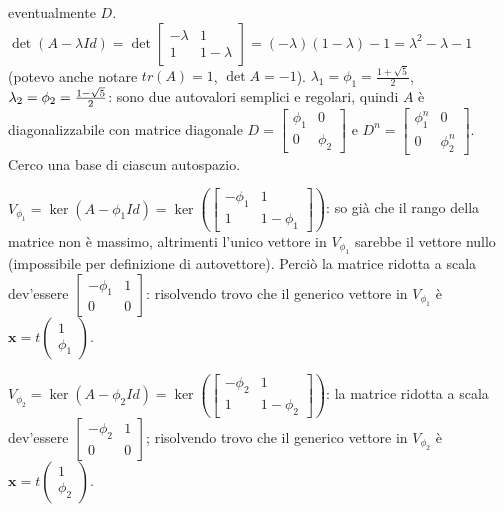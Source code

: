 \documentclass{article}
\begin{document}
\begin{enumerate}
eventualmente $D$. $\det \left( A-\lambda Id\right) =\det \left[ 
\begin{array}{cc}
-\lambda & 1 \\ 
1 & 1-\lambda%
\end{array}%
\right] =\left( -\lambda \right) \left( 1-\lambda \right) -1=\lambda
^{2}-\lambda -1$ (potevo anche notare $tr\left( A\right) =1$, $\det A=-1$). $%
\lambda _{1}=\phi _{1}=\frac{1+\sqrt{5}}{2}$, $\lambda _{2}=\phi _{2}=\frac{%
1-\sqrt{5}}{2}$: sono due autovalori semplici e regolari, quindi $A$ \`{e}
diagonalizzabile con matrice diagonale $D=\left[ 
\begin{array}{cc}
\phi _{1} & 0 \\ 
0 & \phi _{2}%
\end{array}%
\right] $ e $D^{n}=\left[ 
\begin{array}{cc}
\phi _{1}^{n} & 0 \\ 
0 & \phi _{2}^{n}%
\end{array}%
\right] $. Cerco una base di ciascun autospazio.

$V_{\phi _{1}}=\ker \left( A-\phi _{1}Id\right) =\ker \left( \left[ 
\begin{array}{cc}
-\phi _{1} & 1 \\ 
1 & 1-\phi _{1}%
\end{array}%
\right] \right) $: so gi\`{a} che il rango della matrice non \`{e} massimo,
altrimenti l'unico vettore in $V_{\phi _{1}}$ sarebbe il vettore nullo
(impossibile per definizione di autovettore). Perci\`{o} la matrice ridotta
a scala dev'essere $\left[ 
\begin{array}{cc}
-\phi _{1} & 1 \\ 
0 & 0%
\end{array}%
\right] $: risolvendo trovo che il generico vettore in $V_{\phi _{1}}$ \`{e} 
$\mathbf{x}=t\left( 
\begin{array}{c}
1 \\ 
\phi _{1}%
\end{array}%
\right) $.

$V_{\phi _{2}}=\ker \left( A-\phi _{2}Id\right) =\ker \left( \left[ 
\begin{array}{cc}
-\phi _{2} & 1 \\ 
1 & 1-\phi _{2}%
\end{array}%
\right] \right) $: la matrice ridotta a scala dev'essere $\left[ 
\begin{array}{cc}
-\phi _{2} & 1 \\ 
0 & 0%
\end{array}%
\right] $; risolvendo trovo che il generico vettore in $V_{\phi _{2}}$ \`{e} 
$\mathbf{x}=t\left( 
\begin{array}{c}
1 \\ 
\phi _{2}%
\end{array}%
\right) $.


\end{enumerate}
\end{document}
